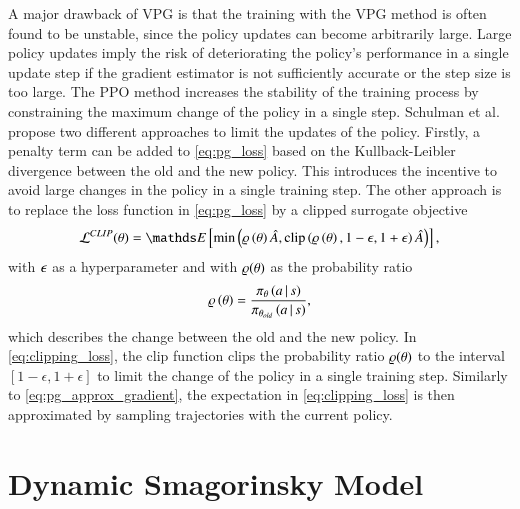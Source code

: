 A major drawback of VPG is that the training with the VPG method is often found to be unstable, since the policy updates can become arbitrarily large.
Large policy updates imply the risk of deteriorating the policy's performance in a single update step if the gradient estimator is not sufficiently accurate or the step size is too large.
The PPO method increases the stability of the training process by constraining the maximum change of the policy in a single step. %
Schulman et al. \cite{schulman2017proximal} propose two different approaches to limit the updates of the policy.
Firstly, a penalty term can be added to \eqref{eq:pg_loss} based on the Kullback-Leibler divergence between the old and the new policy.
This introduces the incentive to avoid large changes in the policy in a single training step.
The other approach is to replace the loss function in \eqref{eq:pg_loss} by a clipped surrogate objective
\begin{equation}
  \loss^{CLIP}(\modelparam) = \expectation\left[\min\left( \probratio\left(\modelparam\right)\hat{\ppoadvantage},\mathrm{clip}\left(\probratio\left(\modelparam\right),1-\eps,1+\eps\right)\hat{\ppoadvantage}   \right)   \right],
  \label{eq:clipping_loss}
\end{equation}
with $\epsilon$ as a hyperparameter and with $\varrho(\theta)$ as the probability ratio
\begin{equation}
  \varrho\left(\theta\right)=\frac{\pi_{\theta}\left(a\,|\,s\right)}{\pi_{\theta_{old}}\left(a\,|\,s\right)},
  \label{eq:prob_ratio}
\end{equation}
which describes the change between the old and the new policy.
In \eqref{eq:clipping_loss}, the clip function clips the probability ratio $\varrho(\theta)$ to the interval $\left[1-\epsilon,1+\epsilon\right]$ to limit the change of the policy in a single training step.
Similarly to \eqref{eq:pg_approx_gradient}, the expectation in \eqref{eq:clipping_loss} is then approximated by sampling trajectories with the current policy.


\section{Dynamic Smagorinsky Model}
\label{app:dynsmago}


